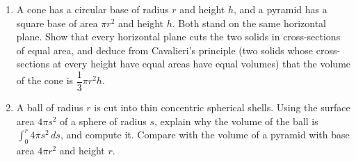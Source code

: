 \begin{enumerate}
\item[(a)] A cone has a circular base of radius $r$ and height $h$, and a pyramid has a square base of area $\pi r^2$ and height $h$. Both stand on the same horizontal plane. Show that every horizontal plane cuts the two solids in cross-sections of equal area, and deduce from Cavalieri's principle (two solids whose cross-sections at every height have equal areas have equal volumes) that the volume of the cone is $\dfrac13\pi r^2h$.
\item[(b)] A ball of radius $r$ is cut into thin concentric spherical shells. Using the surface area $4\pi s^2$ of a sphere of radius $s$, explain why the volume of the ball is $\displaystyle\int_0^r4\pi s^2\,ds$, and compute it. Compare with the volume of a pyramid with base area $4\pi r^2$ and height $r$.
\end{enumerate}
